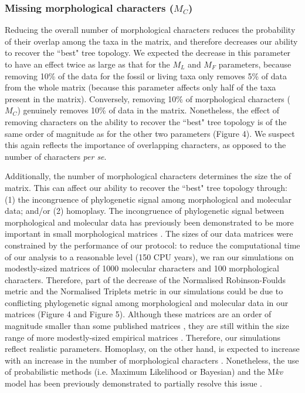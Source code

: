 \documentclass[12pt,letterpaper]{article}
\begin{document}
\subsubsection{Missing morphological characters ($M_{C}$)}
Reducing the overall number of morphological characters reduces the probability of their overlap among the taxa in the matrix, and therefore decreases our ability to recover the ``best" tree topology.
We expected the decrease in this parameter to have an effect twice as large as that for the $M_{L}$ and $M_{F}$ parameters, because removing 10\% of the data for the fossil or living taxa only removes 5\% of data from the whole matrix (because this parameter affects only half of the taxa present in the matrix).
Conversely, removing 10\% of morphological characters ($M_{C}$) genuinely removes 10\% of data in the matrix.
Nonetheless, the effect of removing characters on the ability to recover the ``best" tree topology is of the same order of magnitude as for the other two parameters (Figure 4).
We suspect this again reflects the importance of overlapping characters, as opposed to the number of characters \textit{per se}.

Additionally, the number of morphological characters determines the size the of matrix.
This can affect our ability to recover the ``best" tree topology through: (1) the incongruence of phylogenetic signal among morphological and molecular data; and/or (2) homoplasy.
The incongruence of phylogenetic signal between morphological and molecular data has previously been demonstrated to be more important in small morphological matrices \citep{wagner2000}.
The sizes of our data matrices were constrained by the performance of our protocol: to reduce the computational time of our analysis to a reasonable level (150 CPU years), we ran our simulations on modestly-sized matrices of 1000 molecular characters and 100 morphological characters.
Therefore, part of the decrease of the Normalised Robinson-Foulds metric and the Normalised Triplets metric in our simulations could be due to conflicting phylogenetic signal among morphological and molecular data in our matrices (Figure 4 and Figure 5).
Although these matrices are an order of magnitude smaller than some published matrices \citep[e.g.][]{springermacroevolutionary2012,nithe2013}, they are still within the size range of more modestly-sized empirical matrices \citep[e.g.][]{kellymolecular2014, sallam2011craniodental}.
Therefore, our simulations reflect realistic parameters. Homoplasy, on the other hand, is expected to increase with an increase in the number of morphological characters \citep{wrightbayesian2014}. 
Nonetheless, the use of probabilistic methods (i.e. Maximum Likelihood or Bayesian) and the M\textit{kv} model \citep{lewisa2001} has been previously demonstrated to partially resolve this issue \citep{wrightbayesian2014}.
\end{document}
